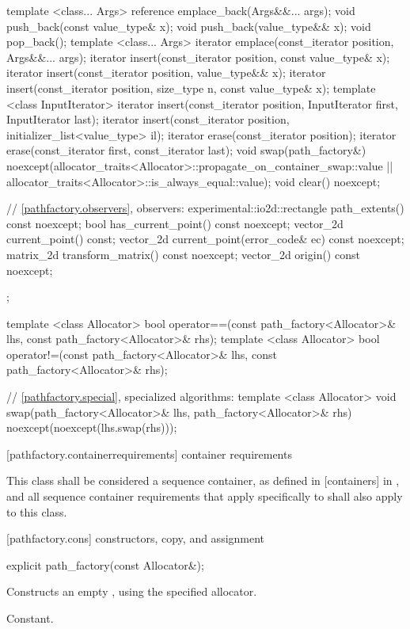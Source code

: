 \begin{codeblock}
{{{{{    template <class... Args>
    reference emplace_back(Args&&... args);
    void push_back(const value_type& x);
    void push_back(value_type&& x);
    void pop_back();
    template <class... Args>
    iterator emplace(const_iterator position, Args&&... args);
    iterator insert(const_iterator position, const value_type& x);
    iterator insert(const_iterator position, value_type&& x);
    iterator insert(const_iterator position, size_type n, const value_type& x);
    template <class InputIterator>
    iterator insert(const_iterator position, InputIterator first,
      InputIterator last);
    iterator insert(const_iterator position,
      initializer_list<value_type> il);
    iterator erase(const_iterator position);
    iterator erase(const_iterator first, const_iterator last);
    void swap(path_factory&)
      noexcept(allocator_traits<Allocator>::propagate_on_container_swap::value 
        || allocator_traits<Allocator>::is_always_equal::value);
    void clear() noexcept;

    // \ref{pathfactory.observers}, observers:
    experimental::io2d::rectangle path_extents() const noexcept;
    bool has_current_point() const noexcept;
    vector_2d current_point() const;
    vector_2d current_point(error_code& ec) const noexcept;
    matrix_2d transform_matrix() const noexcept;
    vector_2d origin() const noexcept;
  };
  
  template <class Allocator>
  bool operator==(const path_factory<Allocator>& lhs, 
    const path_factory<Allocator>& rhs);
  template <class Allocator>
  bool operator!=(const path_factory<Allocator>& lhs, 
    const path_factory<Allocator>& rhs);
  
  // \ref{pathfactory.special}, specialized algorithms:
  template <class Allocator>
  void swap(path_factory<Allocator>& lhs, path_factory<Allocator>& rhs)
    noexcept(noexcept(lhs.swap(rhs)));
} } } }
\end{codeblock}

 [pathfactory.containerrequirements] { container requirements}

\pnum
This class shall be considered a sequence container, as defined in [containers] in \cppseventeen, and all sequence container requirements that apply specifically to  shall also apply to this class.

 [pathfactory.cons] { constructors, copy, and assignment}

\begin{itemdecl}
	explicit path_factory(const Allocator&);
\end{itemdecl}
\begin{itemdescr}
	\pnum
	\effects
	Constructs an empty , using the specified allocator.
	
	\pnum
	\complexity
	Constant.
\end{itemdescr}


